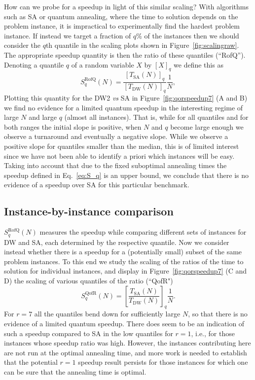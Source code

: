 How can we probe for a speedup in light of this similar scaling? With algorithms such as SA or quantum annealing, where the time to solution depends on the problem instance, it is impractical to experimentally find the hardest problem instance. If instead we target a fraction of $q$\% of the instances then we should consider the $q$th quantile in the scaling plots shown in Figure~\ref{fig:scalingraw}. The appropriate speedup quantity is then the ratio of these quantiles (``RofQ''). Denoting a quantile $q$ of a random variable $X$ by $[X]_q$ we define this as
\begin{equation}
S^{\textrm{RofQ}}_q(N) =
\frac{[T_{\textrm{SA}}(N)]_q}{[T_{\textrm{DW}}(N)]_q}  \frac{1}{N} ,
\label{eq:S_q}
\end{equation}
Plotting this quantity for the DW2 \textit{vs} SA in Figure~\ref{fig:qorspeedup7} (A and B) we find no evidence for a limited quantum speedup in the interesting regime of large $N$ and large $q$ (almost all instances). That is, while for all quantiles and for both ranges the initial slope is positive, when $N$ and $q$ become large enough we observe a turnaround and eventually a negative slope. While we observe a positive slope for quantiles smaller than the median, this is of limited interest since we have not been able to identify a priori which instances will be easy. Taking into account that due to the fixed suboptimal annealing times the speedup defined in Eq.~\eqref{eq:S_q} is an upper bound, we conclude that there is no evidence of a speedup over SA for this particular benchmark.

\subsection{Instance-by-instance comparison}

$S^{\textrm{RofQ}}_q(N)$ measures the speedup while comparing different sets of instances for DW and SA, each determined by the respective quantile. Now we consider instead whether there is a speedup for a (potentially small) subset of the same problem instances. To this end we study the scaling of the ratios of the time to solution for individual instances, and display in Figure~\ref{fig:qorspeedup7} (C and D) the scaling of various quantiles of the ratio (``QofR")
\begin{equation}
S_q^{\textrm{QofR}}(N) =
\left[\frac{T_{\textrm{SA}}(N)}{T_{\textrm{DW}}(N)}\right]_q \frac{1}{N} .
\label{eq:SQoR}
\end{equation}
For $r=7$ all the quantiles bend down for sufficiently large $N$, so that there is no evidence of a limited quantum speedup. There does seem to be an indication of such a speedup compared to SA in the low quantiles for $r=1$, i.e., for those instances whose speedup ratio was high. However, the instances contributing here are not run at the optimal annealing time, and more work is needed to establish that the potential $r=1$ speedup result persists for those instances for which one can be sure that the annealing time is optimal.

